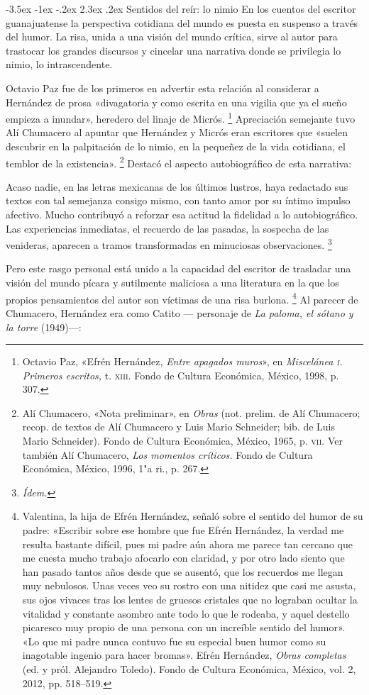 \documentclass[14pt,twoside,final]{extbook} %
\makeatletter
\let\oldfootnote\footnote
\renewcommand\footnote[1]{%
\oldfootnote{\hspace{1mm}#1}}
\renewcommand\section{\@startsection {section}{1}{\z@}%
                                     {-3.5ex \@plus -1ex \@minus -.2ex}%
                                     {2.3ex \@plus .2ex}%
                                     {\normalfont\large\bfseries\sc}}
\makeatother
\begin{document}
\section{Sentidos del reír: lo nimio}\label{sec:sentidos-del-reir-lo-nimio}
En los cuentos del escritor guanajuatense la perspectiva cotidiana del mundo es puesta en suspenso a través del humor. La risa, unida a una visión del mundo crítica, sirve al autor para trastocar los grandes discursos y cincelar una narrativa donde se privilegia lo nimio, lo intrascendente.

Octavio Paz fue de los primeros en advertir esta relación al considerar a Hernández de prosa «divagatoria y como escrita en una vigilia que ya el sueño empieza a inundar», heredero del linaje de Micrós.\footnote{Octavio Paz, «Efrén Hernández, \emph{Entre apagados muros}», en \emph{Miscelánea \textsc{i}. Primeros escritos,} t. \textsc{xiii}. Fondo de Cultura Económica, México, 1998, p. 307.} Apreciación semejante tuvo Alí Chumacero al apuntar que Hernández y Micrós eran escritores que «suelen descubrir en la palpitación de lo nimio, en la pequeñez de la vida cotidiana, el temblor de la existencia».\footnote{Alí Chumacero, «Nota preliminar», en  \emph{Obras} (not. prelim. de Alí Chumacero; recop. de textos de Alí Chumacero y Luis Mario Schneider; bib. de Luis Mario Schneider). Fondo de Cultura Económica, México, 1965, p. \textsc{vii}. Ver también Alí Chumacero, \emph{Los momentos críticos.} Fondo de Cultura Económica, México, 1996, 1"a ri., p. 267.} Destacó el aspecto autobiográfico de esta narrativa:
\begin{quoting}
Acaso nadie, en las letras mexicanas de los últimos lustros, haya redactado sus textos con tal semejanza consigo mismo, con tanto amor por su íntimo impulso afectivo. Mucho contribuyó a reforzar esa actitud la fidelidad a lo autobiográfico. Las experiencias inmediatas, el recuerdo de las pasadas, la sospecha de las venideras, aparecen a tramos transformadas en minuciosas observaciones.\footnote{\em Ídem.}
\end{quoting}
Pero este rasgo personal está unido a la capacidad del escritor de trasladar una visión del mundo pícara y sutilmente maliciosa a una literatura en la que los propios pensamientos del autor son víctimas de una risa burlona.\footnote{Valentina, la hija de Efrén Hernández, señaló sobre el sentido del humor de su padre: «Escribir sobre ese hombre que fue Efrén Hernández, la verdad me resulta bastante difícil, pues mi padre aún ahora me parece tan cercano que me cuesta mucho trabajo afocarlo con claridad, y por otro lado siento que han pasado tantos años desde que se ausentó, que los recuerdos me llegan muy nebulosos. Unas veces veo su rostro con una nitidez que casi me asusta, sus ojos vivaces tras los lentes de gruesos cristales que no lograban ocultar la vitalidad y constante asombro ante todo lo que le rodeaba, y aquel destello picaresco muy propio de una persona con un increíble sentido del humor». «Lo que mi padre nunca contuvo fue su especial buen humor como su inagotable ingenio para hacer bromas». Efrén Hernández, \emph{Obras completas} (ed. y pról. Alejandro Toledo). Fondo de Cultura Económica, México, vol. 2, 2012, pp. 518--519.} Al parecer de Chumacero, Hernández era como Catito --- personaje de \emph{La paloma, el sótano y la torre} (1949)---:
\end{document}
